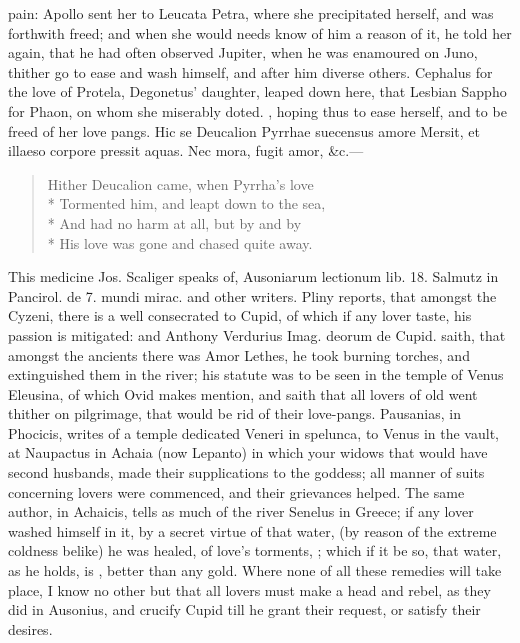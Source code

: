 {pain: Apollo sent her to Leucata Petra, where she precipitated herself,
and was forthwith freed; and when she would needs know of him a reason
of it, he told her again, that he had often observed Jupiter,
when he was enamoured on Juno, thither go to ease and wash himself, and
after him diverse others. Cephalus for the love of Protela, Degonetus'
daughter, leaped down here, that Lesbian Sappho for Phaon, on whom she
miserably doted. ,
hoping thus to ease herself, and to be freed of her love pangs.
Hic se Deucalion Pyrrhae suecensus amore
Mersit, et illaeso corpore pressit aquas.
Nec mora, fugit amor, \&c.---

\begin{verse}
Hither Deucalion came, when Pyrrha's love\\*
Tormented him, and leapt down to the sea,\\*
And had no harm at all, but by and by\\*
His love was gone and chased quite away.
\end{verse}

This medicine Jos. Scaliger speaks of, \textlatin{Ausoniarum lectionum lib. 18.}
Salmutz in \textlatin{Pancirol. de 7. mundi mirac.} and other writers. Pliny
reports, that amongst the Cyzeni, there is a well consecrated to Cupid,
of which if any lover taste, his passion is mitigated: and Anthony
Verdurius \textlatin{Imag. deorum de Cupid.} saith, that amongst the ancients there
was Amor Lethes, he took burning torches, and extinguished them
in the river; his statute was to be seen in the temple of Venus
Eleusina, of which Ovid makes mention, and saith that all lovers of old
went thither on pilgrimage, that would be rid of their love-pangs.
Pausanias, in  Phocicis, writes of a temple dedicated Veneri in
spelunca, to Venus in the vault, at Naupactus in Achaia (now Lepanto)
in which your widows that would have second husbands, made their
supplications to the goddess; all manner of suits concerning lovers
were commenced, and their grievances helped. The same author, in
Achaicis, tells as much of the river Senelus in Greece; if any
lover washed himself in it, by a secret virtue of that water, (by
reason of the extreme coldness belike) he was healed, of love's
torments, ; which if it be so,
that water, as he holds, is , better than any gold.
Where none of all these remedies will take place, I know no other but
that all lovers must make a head and rebel, as they did in
Ausonius, and crucify Cupid till he grant their request, or
satisfy their desires.

}
